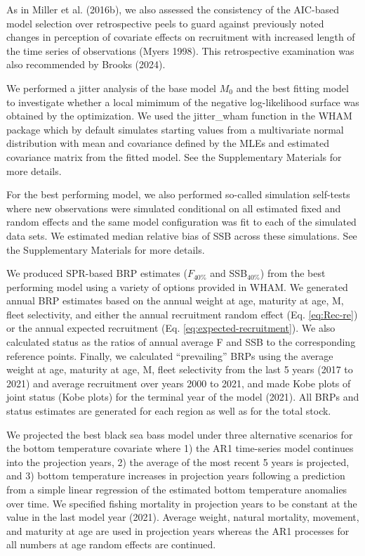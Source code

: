 \documentclass[
]{article}
\begin{document}
As in Miller et al. (2016b), we also assessed the consistency of the
AIC-based model selection over retrospective peels to guard against
previously noted changes in perception of covariate effects on
recruitment with increased length of the time series of observations
(Myers 1998). This retrospective examination was also recommended by
Brooks (2024).

We performed a jitter analysis of the base model \(M_0\) and the best
fitting model to investigate whether a local mimimum of the negative
log-likelihood surface was obtained by the optimization. We used the
jitter\_wham function in the WHAM package which by default simulates
starting values from a multivariate normal distribution with mean and
covariance defined by the MLEs and estimated covariance matrix from the
fitted model. See the Supplementary Materials for more details.

For the best performing model, we also performed so-called simulation
self-tests where new observations were simulated conditional on all
estimated fixed and random effects and the same model configuration was
fit to each of the simulated data sets. We estimated median relative
bias of SSB across these simulations. See the Supplementary Materials
for more details.

We produced SPR-based BRP estimates (\(F_{40\%}\) and SSB\(_{40\%}\))
from the best performing model using a variety of options provided in
WHAM. We generated annual BRP estimates based on the annual weight at
age, maturity at age, M, fleet selectivity, and either the annual
recruitment random effect (Eq. \ref{eq:Rec-re}) or the annual expected
recruitment (Eq. \ref{eq:expected-recruitment}). We also calculated
status as the ratios of annual average F and SSB to the corresponding
reference points. Finally, we calculated ``prevailing'' BRPs using the
average weight at age, maturity at age, M, fleet selectivity from the
last 5 years (2017 to 2021) and average recruitment over years 2000 to
2021, and made Kobe plots of joint status (Kobe plots) for the terminal
year of the model (2021). All BRPs and status estimates are generated
for each region as well as for the total stock.

We projected the best black sea bass model under three alternative
scenarios for the bottom temperature covariate where 1) the AR1
time-series model continues into the projection years, 2) the average of
the most recent 5 years is projected, and 3) bottom temperature
increases in projection years following a prediction from a simple
linear regression of the estimated bottom temperature anomalies over
time. We specified fishing mortality in projection years to be constant
at the value in the last model year (2021). Average weight, natural
mortality, movement, and maturity at age are used in projection years
whereas the AR1 processes for all numbers at age random effects are
continued.
\end{document}
